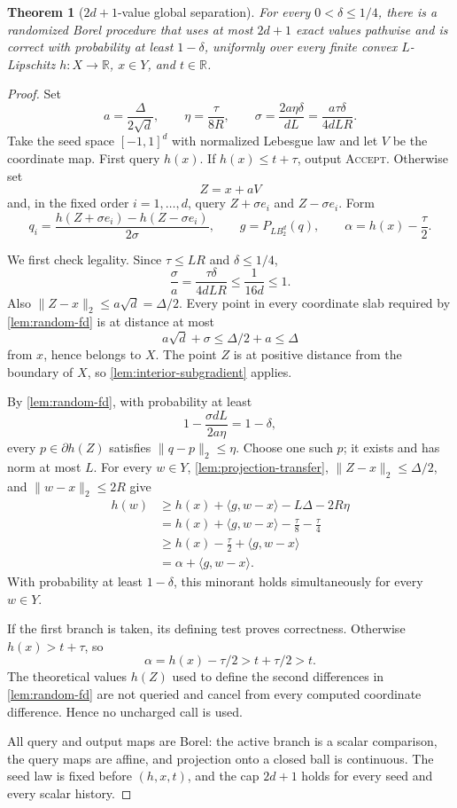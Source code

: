 \documentclass[11pt]{article}
\numberwithin{equation}{section}
\newtheorem{theorem}{Theorem}[section]
\theoremstyle{remark}
\theoremstyle{definition}
\newcommand{\R}{\mathbb{R}}
\newcommand{\Ball}{B_2}
\newcommand{\ip}[2]{\langle #1,#2\rangle}
\newcommand{\norm}[1]{\lVert #1\rVert_2}
\begin{document}
\begin{theorem}[$2d+1$-value global separation]
\label{thm:separator}
For every $0<\delta\le1/4$, there is a randomized Borel procedure that uses at most $2d+1$ exact values pathwise and is correct with probability at least $1-\delta$, uniformly over every finite convex $L$-Lipschitz $h:X\to\R$, $x\in Y$, and $t\in\R$.
\end{theorem}

\begin{proof}
Set
\[
a=\frac{\Delta}{2\sqrt d},
\qquad
\eta=\frac{\tau}{8R},
\qquad
\sigma=\frac{2a\eta\delta}{dL}
=\frac{a\tau\delta}{4dLR}.
\]
Take the seed space $[-1,1]^d$ with normalized Lebesgue law and let $V$ be the coordinate map.  First query $h(x)$.  If $h(x)\le t+\tau$, output \textsc{Accept}.  Otherwise set
\[
Z=x+aV
\]
and, in the fixed order $i=1,\ldots,d$, query $Z+\sigma e_i$ and $Z-\sigma e_i$.  Form
\[
q_i=\frac{h(Z+\sigma e_i)-h(Z-\sigma e_i)}{2\sigma},
\qquad
g=P_{L\Ball^d}(q),
\qquad
\alpha=h(x)-\frac\tau2.
\]

We first check legality.  Since $\tau\le LR$ and $\delta\le1/4$,
\[
\frac\sigma a=\frac{\tau\delta}{4dLR}\le\frac1{16d}\le1.
\]
Also $\norm{Z-x}\le a\sqrt d=\Delta/2$.  Every point in every coordinate slab required by \cref{lem:random-fd} is at distance at most
\[
a\sqrt d+\sigma\le\Delta/2+a\le\Delta
\]
from $x$, hence belongs to $X$.  The point $Z$ is at positive distance from the boundary of $X$, so \cref{lem:interior-subgradient} applies.

By \cref{lem:random-fd}, with probability at least
\[
1-\frac{\sigma dL}{2a\eta}=1-\delta,
\]
every $p\in\partial h(Z)$ satisfies $\norm{q-p}\le\eta$.  Choose one such $p$; it exists and has norm at most $L$.  For every $w\in Y$, \cref{lem:projection-transfer}, $\norm{Z-x}\le\Delta/2$, and $\norm{w-x}\le2R$ give
\begin{align*}
h(w)
&\ge h(x)+\ip g{w-x}-L\Delta-2R\eta\\
&=h(x)+\ip g{w-x}-\frac\tau8-\frac\tau4\\
&\ge h(x)-\frac\tau2+\ip g{w-x}\\
&=\alpha+\ip g{w-x}.
\end{align*}
With probability at least $1-\delta$, this minorant holds simultaneously for every $w\in Y$.

If the first branch is taken, its defining test proves correctness.  Otherwise $h(x)>t+\tau$, so
\[
\alpha=h(x)-\tau/2>t+\tau/2>t.
\]
The theoretical values $h(Z)$ used to define the second differences in \cref{lem:random-fd} are not queried and cancel from every computed coordinate difference.  Hence no uncharged call is used.

All query and output maps are Borel: the active branch is a scalar comparison, the query maps are affine, and projection onto a closed ball is continuous.  The seed law is fixed before $(h,x,t)$, and the cap $2d+1$ holds for every seed and every scalar history.
\end{proof}
\end{document}
